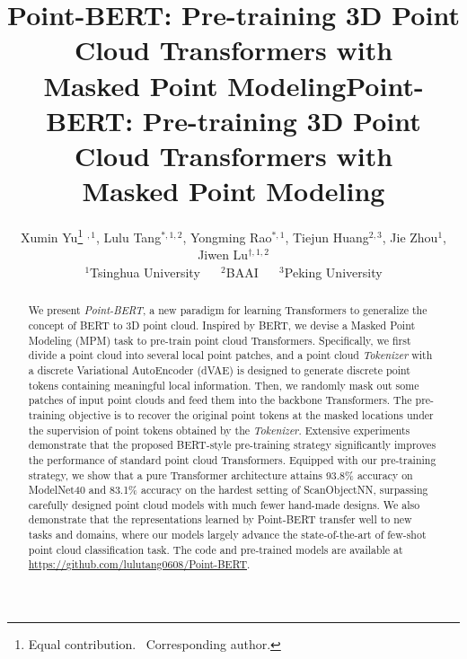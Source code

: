 \title{Point-BERT: Pre-training 3D Point Cloud Transformers with \\ Masked Point Modeling}



\title{Point-BERT: Pre-training 3D Point Cloud Transformers with \\ Masked Point Modeling}
	
	\author{
	Xumin Yu\thanks{Equal contribution. ~\textsuperscript{\dag}Corresponding author.} $  ^{,1}$,
	Lulu Tang$^{*,1,2}$, 
	Yongming Rao$^{*,1}$, 
	Tiejun Huang$^{2,3}$, 
	Jie Zhou$^{1}$, 
	Jiwen Lu$^{\dagger,1,2}$      \\
    $^1$Tsinghua University ~~	$^2$BAAI ~~  $^3$Peking University  \\
	}
	
	\maketitle
	\begin{abstract}
    We present \textit{Point-BERT}, a new paradigm for learning Transformers to generalize the concept of BERT\cite{bert} to 3D point cloud. Inspired by BERT, we devise a Masked Point Modeling (MPM) task to pre-train point cloud Transformers. Specifically,  we first divide a point cloud into several local point patches, and a point cloud \textit{Tokenizer} with a discrete Variational AutoEncoder (dVAE) is designed to generate discrete point tokens containing meaningful local information. Then, we randomly mask out some patches of input point clouds and feed them into the backbone Transformers. The pre-training objective is to recover the original point tokens at the masked locations under the supervision of point tokens obtained by the \textit{Tokenizer}. Extensive experiments demonstrate that the proposed  BERT-style pre-training strategy significantly improves the performance of standard point cloud Transformers. Equipped with our pre-training strategy, we show that a pure Transformer architecture attains 93.8\% accuracy on ModelNet40 and 83.1\% accuracy on the hardest setting of ScanObjectNN, surpassing carefully designed point cloud models with much fewer hand-made designs. We also demonstrate that the representations learned by Point-BERT transfer well to new tasks and domains, where our models largely advance the state-of-the-art of few-shot point cloud classification task. The code and pre-trained models are available at \url{https://github.com/lulutang0608/Point-BERT}.
	\end{abstract}
	

